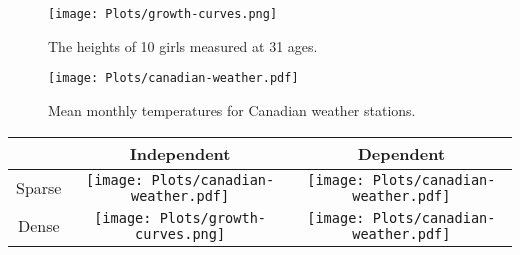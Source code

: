 
\frame
{
\begin{figure}
\begin{center}
\texttt{[image: Plots/growth-curves.png]}
\caption{ The heights of 10 girls measured at 31 ages.}
\end{center}
\end{figure}
}

\frame
{
\begin{figure}
\begin{center}
\texttt{[image: Plots/canadian-weather.pdf]}
\caption{ Mean monthly temperatures for Canadian weather stations.}
\end{center}
\end{figure}
}



\begin{frame}[t]{}
	\begin{tabular}{c|c|c|}
		& Independent & Dependent \\
		\hline
		Sparse & \texttt{[image: Plots/canadian-weather.pdf]} & \texttt{[image: Plots/canadian-weather.pdf]} \\
		\hline
		Dense & \texttt{[image: Plots/growth-curves.png]} &\texttt{[image: Plots/canadian-weather.pdf]}\\
		\hline
	\end{tabular}
\end{frame}



